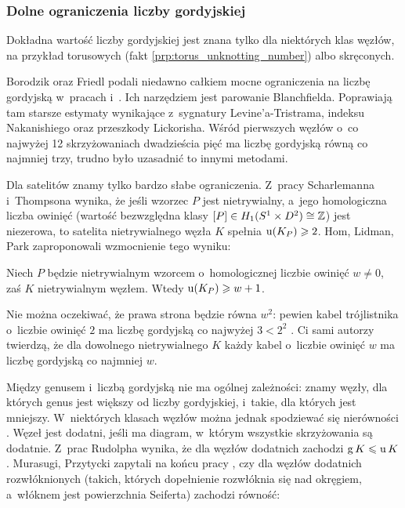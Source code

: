 
\subsubsection{Dolne ograniczenia liczby gordyjskiej}
Dokładna wartość liczby gordyjskiej jest znana tylko dla niektórych klas węzłów, na przykład torusowych (fakt \ref{prp:torus_unknotting_number}) albo skręconych.
%
%

Borodzik oraz Friedl podali niedawno całkiem mocne ograniczenia na liczbę gordyjską w~pracach \cite{borodzik2014} i~\cite{borodzik2015}.
%
%
Ich narzędziem jest parowanie Blanchfielda.
%
Poprawiają tam starsze estymaty wynikające z~sygnatury Levine'a-Tristrama, indeksu Nakanishiego oraz przeszkody Lickorisha.
%
%
%
Wśród pierwszych węzłów o~co najwyżej 12 skrzyżowaniach dwadzieścia pięć ma liczbę gordyjską równą co najmniej trzy, trudno było uzasadnić to innymi metodami.

Dla satelitów znamy tylko bardzo słabe ograniczenia.
Z~pracy Scharlemanna i~Thompsona \cite{thompson1988} wynika, że jeśli wzorzec $P$ jest nietrywialny, a~jego homologiczna liczba owinięć (wartość bezwzględna klasy $[P] \in H_1(S^1 \times D^2) \cong \mathbb Z$) jest niezerowa, to satelita nietrywialnego węzła $K$ spełnia $\operatorname{u}(K_P) \geqslant 2$.
%
%
%
Hom, Lidman, Park \cite{hom2022} zaproponowali wzmocnienie tego wyniku:

\begin{conjecture}
    Niech $P$ będzie nietrywialnym wzorcem o~homologicznej liczbie owinięć $w \neq 0$, zaś $K$ nietrywialnym węzłem.
    Wtedy $\operatorname{u}(K_P) \geqslant w + 1$.
\end{conjecture}

Nie można oczekiwać, że prawa strona będzie równa $w^2$: pewien kabel trójlistnika o~liczbie owinięć $2$ ma liczbę gordyjską co najwyżej $3 < 2^2$ \cite[problem 1.4]{baykur2026}.
%
%
%
Ci sami autorzy twierdzą, że dla dowolnego nietrywialnego $K$ każdy kabel o~liczbie owinięć $w$ ma liczbę gordyjską co najmniej $w$.

Między genusem i~liczbą gordyjską nie ma ogólnej zależności: znamy węzły, dla których genus jest większy od liczby gordyjskiej, i~takie, dla których jest mniejszy.
W~niektórych klasach węzłów można jednak spodziewać się nierówności \cite[problem 1.5]{baykur2026}.
Węzeł jest dodatni, jeśli ma diagram, w~którym wszystkie skrzyżowania są dodatnie.
Z~prac Rudolpha \cite{rudolph1993, rudolph1999} wynika, że dla węzłów dodatnich zachodzi $\operatorname{g} K \leqslant \operatorname{u} K$.
%
%
Murasugi, Przytycki zapytali na końcu pracy \cite{murasugi1989}, czy dla węzłów dodatnich rozwłóknionych (takich, których dopełnienie rozwłóknia się nad okręgiem, a~włóknem jest powierzchnia Seiferta) zachodzi równość:

